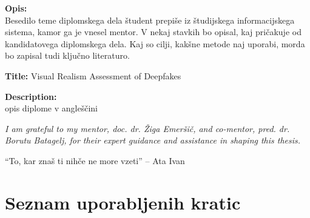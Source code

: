 \documentclass[a4paper,12pt,openright]{book}
\newcommand{\clearemptydoublepage}{\newpage{\pagestyle{empty}\cleardoublepage}}
\begin{document}
\bigskip
\noindent\textbf{Opis:}\\
Besedilo teme diplomskega dela študent prepiše iz študijskega informacijskega sistema, kamor ga je vnesel mentor. 
V nekaj stavkih bo opisal, kaj pričakuje od kandidatovega diplomskega dela. 
Kaj so cilji, kakšne metode naj uporabi, morda bo zapisal tudi ključno literaturo.

\bigskip
\noindent\textbf{Title:} Visual Realism Assessment of Deepfakes

\bigskip
\noindent\textbf{Description:}\\
opis diplome v angleščini

\vfill



\vspace{2cm}

\clearemptydoublepage

\thispagestyle{empty}\mbox{}\vfill\null\it%
\noindent
I am grateful to my mentor, doc. dr. Žiga Emeršič, and co-mentor, pred. dr. Borutu Batagelj, for their expert guidance and assistance in shaping this thesis.
\rm\normalfont

\clearemptydoublepage

\thispagestyle{empty}\mbox{}{\textheight}\mbox{}\hfill\begin{minipage}{0.55\textwidth}%
``To, kar znaš ti nihče ne more vzeti'' -- Ata Ivan

\normalfont\end{minipage}

\clearemptydoublepage

\pagestyle{empty}
\def\thepage{}%
\tableofcontents{}


\clearemptydoublepage

\chapter*{Seznam uporabljenih kratic}
\end{document}
